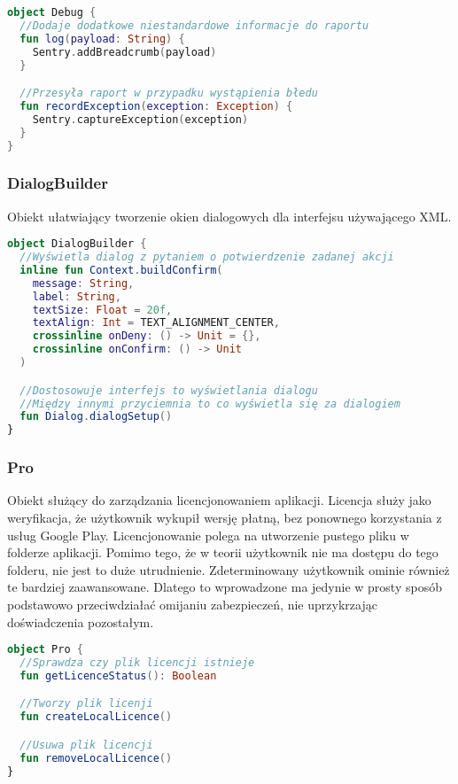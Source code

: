 \begin{lstlisting}[language=Kotlin]
object Debug {
  //Dodaje dodatkowe niestandardowe informacje do raportu
  fun log(payload: String) {
    Sentry.addBreadcrumb(payload)
  }

  //Przesyła raport w przypadku wystąpienia błedu
  fun recordException(exception: Exception) {
    Sentry.captureException(exception)
  }
}
\end{lstlisting}

\subsubsection{DialogBuilder}
Obiekt ułatwiający tworzenie okien dialogowych dla interfejsu używającego XML.

\begin{lstlisting}[language=Kotlin]
object DialogBuilder {
  //Wyświetla dialog z pytaniem o potwierdzenie zadanej akcji
  inline fun Context.buildConfirm(
    message: String,
    label: String,
    textSize: Float = 20f,
    textAlign: Int = TEXT_ALIGNMENT_CENTER,
    crossinline onDeny: () -> Unit = {},
    crossinline onConfirm: () -> Unit
  )

  //Dostosowuje interfejs to wyświetlania dialogu
  //Między innymi przyciemnia to co wyświetla się za dialogiem
  fun Dialog.dialogSetup()
}
\end{lstlisting}

\newpage

\subsubsection{Pro}
Obiekt służący do zarządzania licencjonowaniem aplikacji. Licencja służy jako weryfikacja, że użytkownik wykupił wersję płatną, bez ponownego korzystania z usług Google Play. Licencjonowanie polega na utworzenie pustego pliku w folderze aplikacji. Pomimo tego, że w teorii użytkownik nie ma dostępu do tego folderu, nie jest to duże utrudnienie. Zdeterminowany użytkownik ominie również te bardziej zaawansowane. Dlatego to wprowadzone ma jedynie w prosty sposób podstawowo przeciwdziałać omijaniu zabezpieczeń, nie uprzykrzając doświadczenia pozostałym.

\begin{lstlisting}[language=Kotlin]
object Pro {
  //Sprawdza czy plik licencji istnieje
  fun getLicenceStatus(): Boolean

  //Tworzy plik licenji
  fun createLocalLicence()

  //Usuwa plik licencji
  fun removeLocalLicence()
}
\end{lstlisting}

